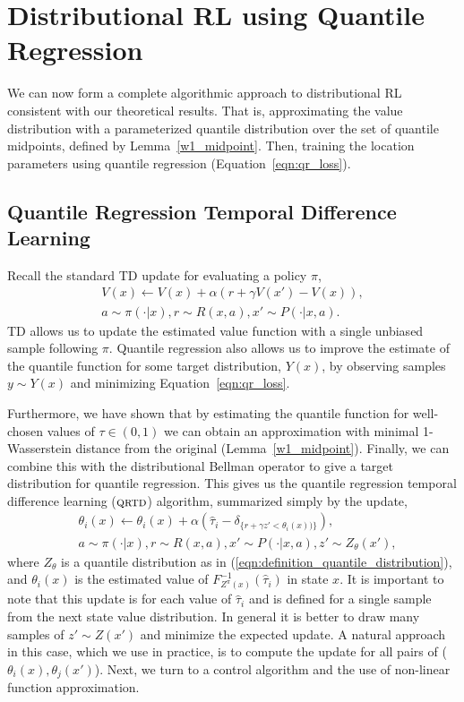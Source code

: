 \documentclass[letterpaper]{article}
\newcommand{\eqnref}[1]{(\ref{eqn:#1})}
\def \qrtd {\textsc{qrtd}}
\begin{document}
\section{Distributional RL using Quantile Regression}
We can now form a complete algorithmic approach to distributional RL consistent with our theoretical results. That is, approximating the value distribution with a parameterized quantile distribution over the set of quantile midpoints, defined by Lemma~\ref{w1_midpoint}. Then, training the location parameters using quantile regression (Equation~\ref{eqn:qr_loss}).

\subsection{Quantile Regression Temporal Difference Learning}

Recall the standard TD update for evaluating a policy $\pi$,
\begin{eqnarray}
    \nonumber V(x) \leftarrow V(x) + \alpha (r + \gamma V(x') - V(x)),\\
    \nonumber a \sim \pi(\cdot | x), r \sim R(x, a), x' \sim P(\cdot | x, a).
\end{eqnarray}
TD allows us to update the estimated value function with a single unbiased sample following $\pi$. Quantile regression also allows us to improve the estimate of the quantile function for some target distribution, $Y(x)$, by observing samples $y \sim Y(x)$ and minimizing Equation~\ref{eqn:qr_loss}.

Furthermore, we have shown that by estimating the quantile function for well-chosen values of $\tau \in (0, 1)$ we can obtain an approximation with minimal 1-Wasserstein distance from the original (Lemma~\ref{w1_midpoint}). Finally, we can combine this with the distributional Bellman operator to give a target distribution for quantile regression. This gives us the quantile regression temporal difference learning ($\qrtd$) algorithm, summarized simply by the update,
\begin{eqnarray}
    &\theta_i(x) \leftarrow \theta_i(x) + \alpha (\hat{\tau}_i - \delta_{\{r + \gamma z' < \theta_i(x))\} }),\\
\nonumber &a \sim \pi(\cdot | x), r \sim R(x, a), x' \sim P(\cdot | x, a), z' \sim Z_\theta(x'),
\end{eqnarray}
where $Z_\theta$ is a quantile distribution as in \eqnref{definition_quantile_distribution}, and $\theta_i(x)$ is the estimated value of $F^{-1}_{Z^\pi(x)}(\hat \tau_i)$ in state $x$. It is important to note that this update is for each value of $\hat \tau_i$ and is defined for a single sample from the next state value distribution. In general it is better to draw many samples of $z' \sim Z(x')$ and minimize the expected update. A natural approach in this case, which we use in practice, is to compute the update for all pairs of ($\theta_i(x), \theta_j(x')$). Next, we turn to a control algorithm and the use of non-linear function approximation.
\end{document}

